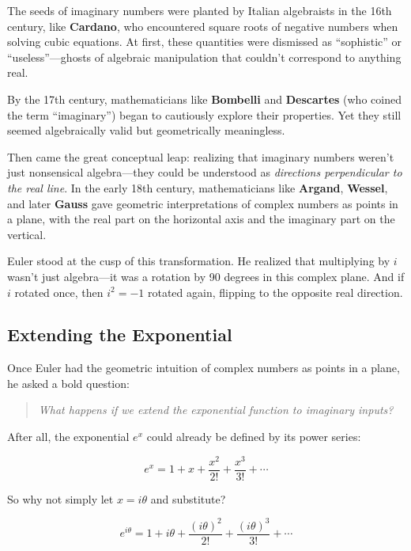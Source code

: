The seeds of imaginary numbers were planted by Italian algebraists in the 16th century, like \textbf{Cardano}, who encountered square roots of negative numbers when solving cubic equations. At first, these quantities were dismissed as “sophistic” or “useless”—ghosts of algebraic manipulation that couldn’t correspond to anything real.

By the 17th century, mathematicians like \textbf{Bombelli} and \textbf{Descartes} (who coined the term “imaginary”) began to cautiously explore their properties. Yet they still seemed algebraically valid but geometrically meaningless.

Then came the great conceptual leap: realizing that imaginary numbers weren’t just nonsensical algebra—they could be understood as \emph{directions perpendicular to the real line}. In the early 18th century, mathematicians like \textbf{Argand}, \textbf{Wessel}, and later \textbf{Gauss} gave geometric interpretations of complex numbers as points in a plane, with the real part on the horizontal axis and the imaginary part on the vertical.

Euler stood at the cusp of this transformation. He realized that multiplying by \( i \) wasn’t just algebra—it was a rotation by 90 degrees in this complex plane. And if \( i \) rotated once, then \( i^2 = -1 \) rotated again, flipping to the opposite real direction.

\vspace{1em}

\subsection{Extending the Exponential}

Once Euler had the geometric intuition of complex numbers as points in a plane, he asked a bold question:

\begin{quote}
\textit{What happens if we extend the exponential function to imaginary inputs?}
\end{quote}

After all, the exponential \( e^x \) could already be defined by its power series:

\[
e^x = 1 + x + \frac{x^2}{2!} + \frac{x^3}{3!} + \cdots
\]

So why not simply let \( x = i\theta \) and substitute?

\[
e^{i\theta} = 1 + i\theta + \frac{(i\theta)^2}{2!} + \frac{(i\theta)^3}{3!} + \cdots
\]

